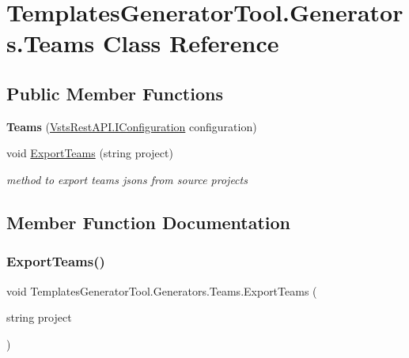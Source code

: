 \hypertarget{class_templates_generator_tool_1_1_generators_1_1_teams}{}\section{Templates\+Generator\+Tool.\+Generators.\+Teams Class Reference}
\label{class_templates_generator_tool_1_1_generators_1_1_teams}
\subsection*{Public Member Functions}
\begin{DoxyCompactItemize}
\item 
\mbox{\label{class_templates_generator_tool_1_1_generators_1_1_teams_a9141923b6c0e573e64c94bdd2da26833}} 
{\bfseries Teams} (\mbox{\hyperlink{interface_vsts_rest_a_p_i_1_1_i_configuration}{Vsts\+Rest\+A\+P\+I.\+I\+Configuration}} configuration)
\item 
void \mbox{\hyperlink{class_templates_generator_tool_1_1_generators_1_1_teams_a3416f9b5acd249ffcd8d63abbb1fe480}{Export\+Teams}} (string project)
\begin{DoxyCompactList}\small\item\em method to export teams jsons from source projects \end{DoxyCompactList}\end{DoxyCompactItemize}


\subsection{Member Function Documentation}
\mbox{\label{class_templates_generator_tool_1_1_generators_1_1_teams_a3416f9b5acd249ffcd8d63abbb1fe480}} 
\subsubsection{\texorpdfstring{Export\+Teams()}{ExportTeams()}}
{\footnotesize\ttfamily void Templates\+Generator\+Tool.\+Generators.\+Teams.\+Export\+Teams (\begin{DoxyParamCaption}\item[{string}]{project }\end{DoxyParamCaption})}




